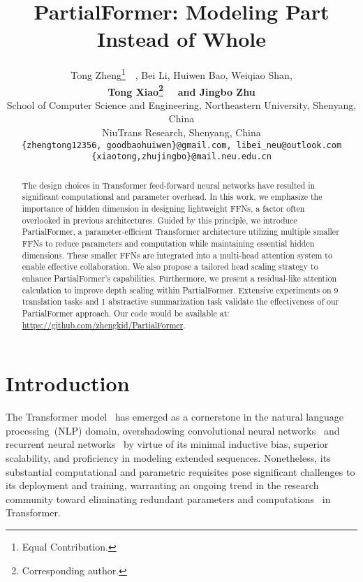 \documentclass[11pt]{article}
\title{PartialFormer: Modeling Part Instead of Whole}
\author{
Tong Zheng\thanks{\xspace\xspace Equal Contribution.
}~~,
  Bei Li,
  Huiwen Bao,
  Weiqiao Shan,\\
  \textbf{Tong Xiao\thanks{\xspace\xspace Corresponding author.}~~}
  \textbf{and Jingbo Zhu}\\
  School of Computer Science and Engineering, Northeastern University, Shenyang, China\\
  NiuTrans Research, Shenyang, China \\
  {\tt
        \{zhengtong12356, goodbaohuiwen\}@gmail.com, libei\_neu@outlook.com
  }\\
  {\tt
        \{xiaotong,zhujingbo\}@mail.neu.edu.cn
  }
}
\begin{document}
\maketitle
\begin{abstract}
The design choices in Transformer feed-forward neural networks have resulted in significant computational and parameter overhead. In this work, we emphasize the importance of hidden dimension in designing lightweight FFNs, a factor often overlooked in previous architectures. Guided by this principle, we introduce PartialFormer, a parameter-efficient Transformer architecture utilizing multiple smaller FFNs to reduce parameters and computation while maintaining essential hidden dimensions. These smaller FFNs are integrated into a multi-head attention system to enable effective collaboration. We also propose a tailored head scaling strategy to enhance PartialFormer's capabilities. Furthermore, we present a residual-like attention calculation to improve depth scaling within PartialFormer. Extensive experiments on 9 translation tasks and 1 abstractive summarization task validate the effectiveness of our PartialFormer approach. Our code would be available
at: \url{https://github.com/zhengkid/PartialFormer}.
\end{abstract}

\section{Introduction}

The Transformer model~\cite{Vaswani2017transformer} has emerged as a cornerstone in the natural language processing~(NLP) domain, overshadowing convolutional neural networks~\cite{Gehring2017convolutionals2s} and recurrent neural networks~\cite{Sutskever2014sequence2sequence} by virtue of its minimal inductive bias, superior scalability, and proficiency in modeling extended sequences. Nonetheless, its substantial computational and parametric requisites pose significant challenges to its deployment and training, warranting an ongoing trend in the research community toward eliminating redundant parameters and computations~\cite{Dehghani2019UniversalTransformer,Mehta2019DeFINEDF, Lan2020ALBERT, Wu2020Lite, Mehta2021Delight,reid-etal-2021-subformer-exploring,li-etal-2022-ode} in Transformer.
\end{document}
